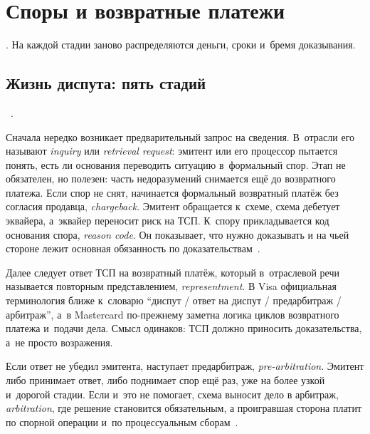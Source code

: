 
\chapter{Споры и возвратные платежи}\label{ch:disputes}

. На каждой стадии
заново распределяются деньги, сроки и~бремя доказывания.

\section{Жизнь диспута: пять стадий}\label{sec:disputes-lifecycle}

~\cite{visa-core-rules,mc-chargeback-guide}.

Сначала нередко возникает предварительный запрос на сведения. В~отрасли
его называют \textit{inquiry} или \textit{retrieval request}: эмитент или его процессор
пытается понять, есть ли основания переводить ситуацию в~формальный
спор. Этап не обязателен, но полезен: часть недоразумений снимается ещё
до возвратного платежа.
Если спор не снят, начинается формальный возвратный платёж без согласия
продавца, \textit{chargeback}. Эмитент обращается к~схеме, схема дебетует эквайера,
а~эквайер переносит риск на ТСП. К~спору прикладывается код основания
спора, \textit{reason code}. Он показывает, что нужно доказывать и на
чьей стороне лежит основная обязанность по доказательствам~\cite{visa-core-rules}.

Далее следует ответ ТСП на возвратный платёж, который в~отраслевой речи
называется повторным представлением, \textit{representment}. В Visa
официальная терминология ближе к~словарю \enquote{диспут / ответ на
диспут / предарбитраж / арбитраж}, а~в Mastercard
по-прежнему заметна логика циклов возвратного платежа и~подачи дела. Смысл
одинаков: ТСП должно приносить доказательства, а~не
просто возражения.

Если ответ не убедил эмитента, наступает предарбитраж, \textit{pre-arbitration}.
Эмитент либо принимает ответ, либо поднимает спор ещё раз, уже на более
узкой и~дорогой стадии. Если и~это не помогает, схема выносит дело в
арбитраж, \textit{arbitration}, где решение становится обязательным, а
проигравшая сторона платит по спорной операции и~по процессуальным
сборам~\cite{visa-core-rules,mc-chargeback-guide}.

